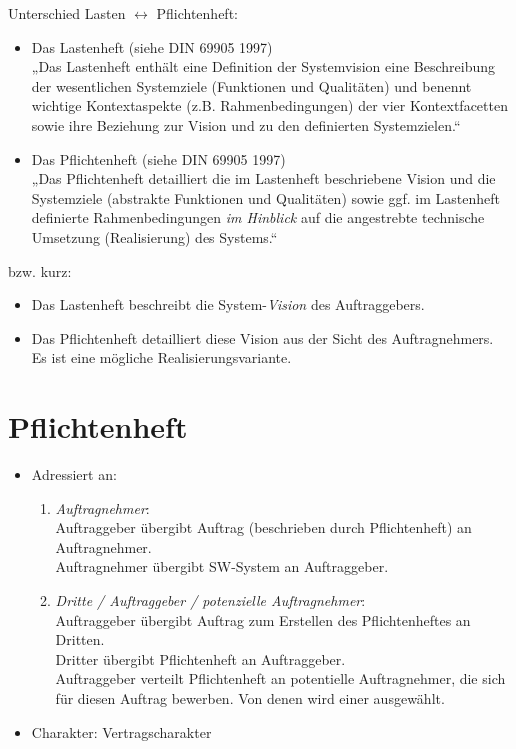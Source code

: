 
Unterschied Lasten $\leftrightarrow$ Pflichtenheft:
\begin{itemize}
\item Das Lastenheft (siehe DIN 69905 1997)\\
„Das Lastenheft enthält eine Definition der Systemvision eine Beschreibung der wesentlichen Systemziele (Funktionen und Qualitäten) und benennt wichtige Kontextaspekte (z.B. Rahmenbedingungen) der vier Kontextfacetten sowie ihre Beziehung zur Vision und zu den definierten Systemzielen.“
\item Das Pflichtenheft (siehe DIN 69905 1997)\\
„Das Pflichtenheft detailliert die im Lastenheft beschriebene Vision und die Systemziele (abstrakte Funktionen und Qualitäten) sowie ggf. im Lastenheft definierte Rahmenbedingungen \emph{im Hinblick} auf die angestrebte technische Umsetzung (Realisierung) des Systems.“
\end{itemize}
bzw. kurz:
\begin{itemize}
\item Das Lastenheft beschreibt die System-\emph{Vision} des Auftraggebers.
\item Das Pflichtenheft detailliert diese Vision aus der Sicht des Auftragnehmers.\\
Es ist eine mögliche Realisierungsvariante.
\end{itemize}

\section{Pflichtenheft}

\begin{itemize}
\item Adressiert an:
\begin{enumerate}
\item \emph{Auftragnehmer}:\\
Auftraggeber übergibt Auftrag (beschrieben durch Pflichtenheft) an Auftragnehmer.\\
Auftragnehmer übergibt SW-System an Auftraggeber.
\item \emph{Dritte / Auftraggeber / potenzielle Auftragnehmer}:\\
Auftraggeber übergibt Auftrag zum Erstellen des Pflichtenheftes an Dritten.\\
Dritter übergibt Pflichtenheft an Auftraggeber.\\
Auftraggeber verteilt Pflichtenheft an potentielle Auftragnehmer, die sich für diesen Auftrag bewerben. Von denen wird einer ausgewählt.
\end{enumerate}
\item Charakter: 
Vertragscharakter
\end{itemize}

